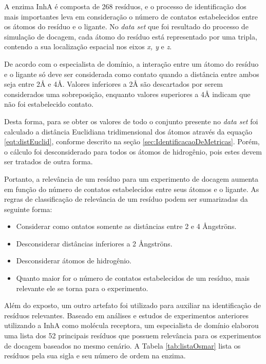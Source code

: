 A enzima InhA é composta de 268 resíduos, e o processo de identificação dos mais importantes leva em consideração o número de contatos estabelecidos entre os átomos do resíduo e o ligante. No \emph{data set} que foi resultado do processo de simulação de docagem, cada átomo do resíduo está representado por uma tripla, contendo a sua localização espacial nos eixos \emph{x, y }e \emph{z}.

De acordo com o especialista de domínio, a interação entre um átomo do resíduo e o ligante só deve ser considerada como contato quando a distância entre ambos seja entre 2{\AA} e 4{\AA}. Valores inferiores a 2{\AA} são descartados por serem considerados uma sobreposição, enquanto valores superiores a 4{\AA} indicam que não foi estabelecido contato. 

Desta forma, para se obter os valores de todo o conjunto presente no \emph{data set} foi calculado a distância Euclidiana tridimensional dos átomos através da equação \ref{eqt:distEuclid}, conforme descrito na seção \ref{sec:IdentificacaoDeMetricas}. Porém, o cálculo foi desconsiderado para todos os átomos de hidrogênio, pois estes devem ser tratados de outra forma.

Portanto, a relevância de um resíduo para um experimento de docagem aumenta em função do número de contatos estabelecidos entre seus átomos e o ligante. As regras de classificação de relevância de um resíduo podem ser sumarizadas da seguinte forma:

\begin{itemize}
	\item Considerar como ontatos somente as distâncias entre 2 e 4 {\AA}ngstr\"ons.
	\item Desconsiderar distâncias inferiores a 2 {\AA}ngstr\"ons.
	\item Desconsiderar átomos de hidrogênio.
	\item Quanto maior for o número de contatos estabelecidos de um resíduo, mais relevante ele se torna para o experimento.
\end{itemize}

Além do exposto, um outro artefato foi utilizado para auxiliar na identificação de resíduos relevantes. Baseado em análises e estudos de experimentos anteriores utilizando a InhA como molécula receptora, um especialista de domínio elaborou uma lista dos 52 principais resíduos que possuem relevância para os experimentos de docagem baseados no mesmo cenário. A Tabela \ref{tab:listaOsmar} lista os resíduos pela sua sigla e seu número de ordem na enzima.

